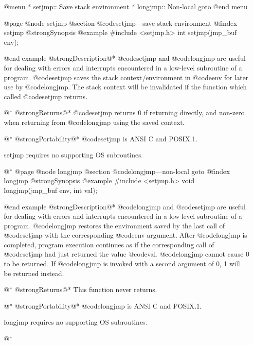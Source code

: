 @menu
* setjmp::      Save stack environment
* longjmp::     Non-local goto
@end menu

@page
@node setjmp
@section @code{setjmp}---save stack environment
@findex setjmp
@strong{Synopsis}
@example
#include <setjmp.h>
int setjmp(jmp_buf env);

@end example
@strong{Description}@*
@code{setjmp} and @code{longjmp} are useful for dealing with errors
and interrupts encountered in a low-level subroutine of a program.
@code{setjmp} saves the stack context/environment in @code{env} for
later use by @code{longjmp}.  The stack context will be invalidated if
the function which called @code{setjmp} returns.

@*
@strong{Returns}@*
@code{setjmp} returns 0 if returning directly, and non-zero when
returning from @code{longjmp} using the saved context.

@*
@strong{Portability}@*
@code{setjmp} is ANSI C and POSIX.1.

setjmp requires no supporting OS subroutines.

@*
@page
@node longjmp
@section @code{longjmp}---non-local goto
@findex longjmp
@strong{Synopsis}
@example
#include <setjmp.h>
void longjmp(jmp_buf env, int val);

@end example
@strong{Description}@*
@code{longjmp} and @code{setjmp} are useful for dealing with errors
and interrupts encountered in a low-level subroutine of a program.
@code{longjmp} restores the environment saved by the last call of
@code{setjmp} with the corresponding @code{env} argument.  After
@code{longjmp} is completed, program execution continues as if the
corresponding call of @code{setjmp} had just returned the value
@code{val}.  @code{longjmp} cannot cause 0 to be returned.  If
@code{longjmp} is invoked with a second argument of 0, 1 will be
returned instead.

@*
@strong{Returns}@*
This function never returns.

@*
@strong{Portability}@*
@code{longjmp} is ANSI C and POSIX.1.

longjmp requires no supporting OS subroutines.

@*
